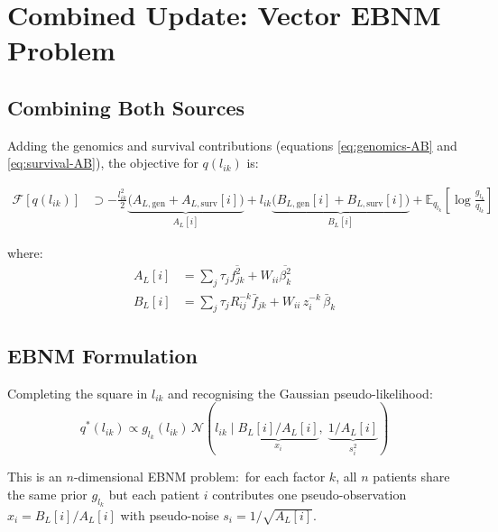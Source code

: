 \documentclass[11pt]{article}
\newcommand{\fbar}[2]{\bar{f}_{#1#2}}
\newcommand{\betabar}[1]{\bar{\beta}_{#1}}
\newcommand{\fsec}[2]{\overline{f^2_{#1#2}}}
\newcommand{\betasec}[1]{\overline{\beta^2_{#1}}}
\newcommand{\Rk}[0]{R^{-k}}
\newcommand{\zk}[0]{z^{-k}}
\begin{document}
\section{Combined Update: Vector EBNM Problem}\label{sec:combined}

\subsection{Combining Both Sources}

Adding the genomics and survival contributions (equations \ref{eq:genomics-AB}
and \ref{eq:survival-AB}), the objective for $q(l_{ik})$ is:

\begin{align}
  \mathcal{F}[q(l_{ik})] &\supset
  -\frac{l_{ik}^2}{2}
    \underbrace{\bigl(A_{L,\text{gen}} + A_{L,\text{surv}}[i]\bigr)}_{A_L[i]}
  + l_{ik}
    \underbrace{\bigl(B_{L,\text{gen}}[i] + B_{L,\text{surv}}[i]\bigr)}_{B_L[i]}
  + \mathbb{E}_{q_{l_k}}\!\left[\log\tfrac{g_{l_k}}{q_{l_k}}\right]
  \label{eq:combined-obj}
\end{align}

where:
\begin{align}
  A_L[i] &= \sum_j \tau_j\fsec{j}{k} + W_{ii}\betasec{k}
  \label{eq:AL} \\[4pt]
  B_L[i] &= \sum_j \tau_j\Rk_{ij}\fbar{j}{k} + W_{ii}\,\zk_i\,\betabar{k}
  \label{eq:BL}
\end{align}

\subsection{EBNM Formulation}

Completing the square in $l_{ik}$ and recognising the Gaussian pseudo-likelihood:
\begin{equation}
  q^*(l_{ik}) \propto g_{l_k}(l_{ik})\,
  \mathcal{N}\!\left(l_{ik}\;\Big|\;
    \underbrace{B_L[i]/A_L[i]}_{x_i},\;
    \underbrace{1/A_L[i]}_{s_i^2}
  \right)
  \label{eq:ebnm-form}
\end{equation}

This is an $n$-dimensional EBNM problem:\ for each factor $k$, all $n$
patients share the same prior $g_{l_k}$ but each patient $i$ contributes
one pseudo-observation $x_i = B_L[i]/A_L[i]$ with pseudo-noise
$s_i = 1/\sqrt{A_L[i]}$.
\end{document}
